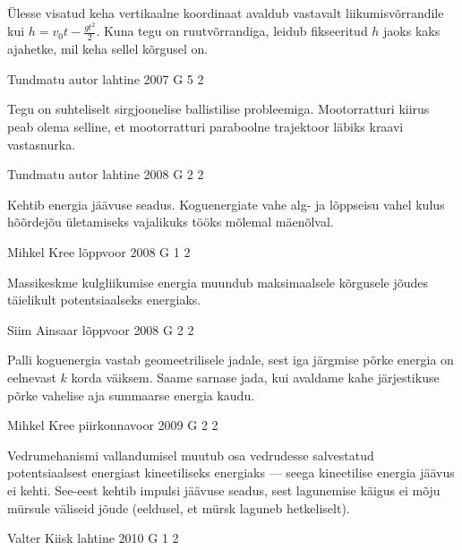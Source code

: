 \documentclass[11pt]{article}
\begin{document}
{{\ifHint
Ülesse visatud keha vertikaalne koordinaat avaldub vastavalt liikumisvõrrandile kui $h = v_0t - \frac{gt^2}{2}$. Kuna tegu on ruutvõrrandiga, leidub fikseeritud $h$ jaoks kaks ajahetke, mil keha sellel kõrgusel on.
\fi
}

{Tundmatu autor} %
{lahtine} %
{2007} %
{G 5} %
{2} %
{

\ifHint
Tegu on suhteliselt sirgjoonelise ballistilise probleemiga. Mootorratturi kiirus peab olema selline, et mootorratturi paraboolne trajektoor läbiks kraavi vastasnurka.
\fi
}

{Tundmatu autor} %
{lahtine} %
{2008} %
{G 2} %
{2} %
{

\ifHint
Kehtib energia jäävuse seadus. Koguenergiate vahe alg- ja lõppseisu vahel kulus hõõrdejõu ületamiseks vajalikuks tööks mõlemal mäenõlval.
\fi
}

{Mihkel Kree} %
{lõppvoor} %
{2008} %
{G 1} %
{2} %
{

\ifHint
Massikeskme kulgliikumise energia muundub maksimaalsele kõrgusele jõudes täielikult potentsiaalseks energiaks.
\fi
}

{Siim Ainsaar} %
{lõppvoor} %
{2008} %
{G 2} %
{2} %
{

\ifHint
Palli koguenergia vastab geomeetrilisele jadale, sest iga järgmise põrke energia on eelnevast $k$ korda väiksem. Saame sarnase jada, kui avaldame kahe järjestikuse põrke vahelise aja summaarse energia kaudu.
\fi
}

{Mihkel Kree} %
{piirkonnavoor} %
{2009} %
{G 2} %
{2} %
{

\ifHint
Vedrumehanismi vallandumisel muutub osa vedrudesse salvestatud potentsiaalsest energiast kineetiliseks energiaks --- seega kineetilise energia jäävus ei kehti. See-eest kehtib impulsi jäävuse seadus, sest lagunemise käigus ei mõju mürsule väliseid jõude (eeldusel, et mürsk laguneb hetkeliselt).
\fi
}

{Valter Kiisk} %
{lahtine} %
{2010} %
{G 1} %
{2} %
{

}}
\end{document}
